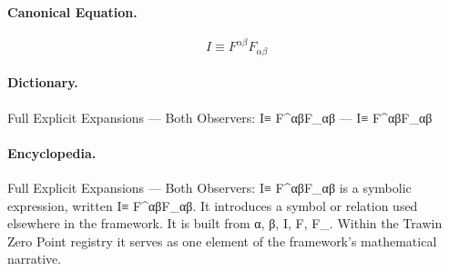 \paragraph{Canonical Equation.}
\[
I\equiv F^{\alpha\beta}F_{\alpha\beta}
\]

\paragraph{Dictionary.}
Full Explicit Expansions — Both Observers: I≡ F\textasciicircum{}αβF\_αβ — I≡ F\textasciicircum{}αβF\_αβ

\paragraph{Encyclopedia.}
Full Explicit Expansions — Both Observers: I≡ F\textasciicircum{}αβF\_αβ is a symbolic expression, written I≡ F\textasciicircum{}αβF\_αβ. It introduces a symbol or relation used elsewhere in the framework. It is built from α, β, I, F, F\_. Within the Trawin Zero Point registry it serves as one element of the framework's mathematical narrative.
